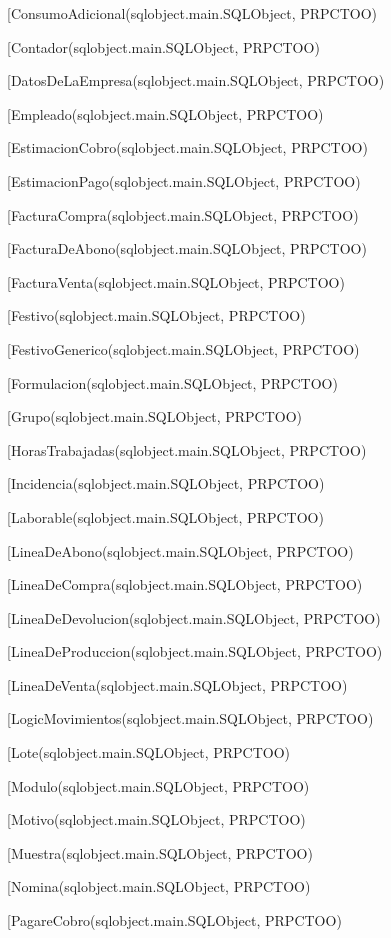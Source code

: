 \begin{description}
\begin{description}
\item[ConsumoAdicional(sqlobject.main.SQLObject, PRPCTOO)
\item[Contador(sqlobject.main.SQLObject, PRPCTOO)
\item[DatosDeLaEmpresa(sqlobject.main.SQLObject, PRPCTOO)
\item[Empleado(sqlobject.main.SQLObject, PRPCTOO)
\item[EstimacionCobro(sqlobject.main.SQLObject, PRPCTOO)
\item[EstimacionPago(sqlobject.main.SQLObject, PRPCTOO)
\item[FacturaCompra(sqlobject.main.SQLObject, PRPCTOO)
\item[FacturaDeAbono(sqlobject.main.SQLObject, PRPCTOO)
\item[FacturaVenta(sqlobject.main.SQLObject, PRPCTOO)
\item[Festivo(sqlobject.main.SQLObject, PRPCTOO)
\item[FestivoGenerico(sqlobject.main.SQLObject, PRPCTOO)
\item[Formulacion(sqlobject.main.SQLObject, PRPCTOO)
\item[Grupo(sqlobject.main.SQLObject, PRPCTOO)
\item[HorasTrabajadas(sqlobject.main.SQLObject, PRPCTOO)
\item[Incidencia(sqlobject.main.SQLObject, PRPCTOO)
\item[Laborable(sqlobject.main.SQLObject, PRPCTOO)
\item[LineaDeAbono(sqlobject.main.SQLObject, PRPCTOO)
\item[LineaDeCompra(sqlobject.main.SQLObject, PRPCTOO)
\item[LineaDeDevolucion(sqlobject.main.SQLObject, PRPCTOO)
\item[LineaDeProduccion(sqlobject.main.SQLObject, PRPCTOO)
\item[LineaDeVenta(sqlobject.main.SQLObject, PRPCTOO)
\item[LogicMovimientos(sqlobject.main.SQLObject, PRPCTOO)
\item[Lote(sqlobject.main.SQLObject, PRPCTOO)
\item[Modulo(sqlobject.main.SQLObject, PRPCTOO)
\item[Motivo(sqlobject.main.SQLObject, PRPCTOO)
\item[Muestra(sqlobject.main.SQLObject, PRPCTOO)
\item[Nomina(sqlobject.main.SQLObject, PRPCTOO)
\item[PagareCobro(sqlobject.main.SQLObject, PRPCTOO)

\end{description}
\end{description}
